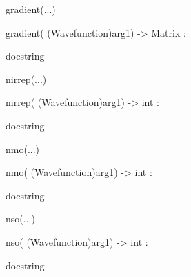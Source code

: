 \documentclass[letterpaper,10pt,english]{sphinxmanual}
\begin{document}
\begin{description}
\begin{description}
\begin{DUlineblock}{0em}
\begin{DUlineblock}{\DUlineblockindent}
\end{DUlineblock}
\item[] gradient(...)
\item[]
\begin{DUlineblock}{\DUlineblockindent}
\item[] gradient( (Wavefunction)arg1) -\textgreater{} Matrix :
\item[]
\begin{DUlineblock}{\DUlineblockindent}
\item[] docstring
\item[] 
\end{DUlineblock}
\end{DUlineblock}
\item[] nirrep(...)
\item[]
\begin{DUlineblock}{\DUlineblockindent}
\item[] nirrep( (Wavefunction)arg1) -\textgreater{} int :
\item[]
\begin{DUlineblock}{\DUlineblockindent}
\item[] docstring
\item[] 
\end{DUlineblock}
\end{DUlineblock}
\item[] nmo(...)
\item[]
\begin{DUlineblock}{\DUlineblockindent}
\item[] nmo( (Wavefunction)arg1) -\textgreater{} int :
\item[]
\begin{DUlineblock}{\DUlineblockindent}
\item[] docstring
\item[] 
\end{DUlineblock}
\end{DUlineblock}
\item[] nso(...)
\item[]
\begin{DUlineblock}{\DUlineblockindent}
\item[] nso( (Wavefunction)arg1) -\textgreater{} int :
\item[]
\begin{DUlineblock}{\DUlineblockindent}
\item[] docstring
\item[] 
\end{DUlineblock}
\end{DUlineblock}

\end{DUlineblock}
\end{description}
\end{description}
\end{document}
